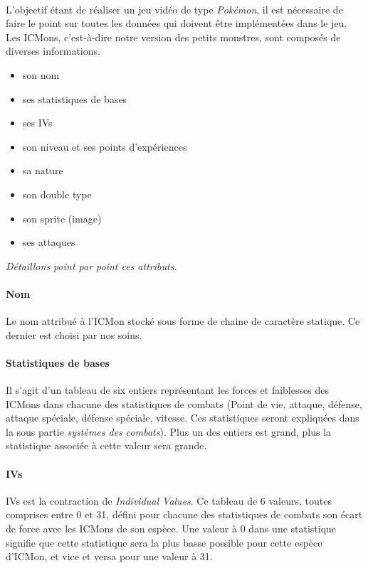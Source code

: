 \documentclass[12pt,a4paper, twoside]{article}
\begin{document}
        \paragraph{} L'objectif étant de réaliser un jeu vidéo de type \emph{Pokémon}, il est nécessaire de faire le point sur toutes les données qui doivent être implémentées dans le jeu.\\
        Les ICMons, c'est-à-dire notre version des petits monstres, sont composés de diverses informations. \\
        \begin{itemize}
            \item son nom
            \item ses statistiques de bases
            \item ses IVs
            \item son niveau et ses points d'expériences
            \item sa nature
            \item son double type
            \item son sprite (image)
            \item ses attaques
        \end{itemize}
        \emph{Détaillons point par point ces attributs.}
        \paragraph{Nom} Le nom attribué à l'ICMon stocké sous forme de chaine de caractère statique. Ce dernier est choisi par nos soins.
        \paragraph{Statistiques de bases} Il s'agit d'un tableau de six entiers représentant les forces et faiblesses des ICMons dans chacune des statistiques de combats (Point de vie, attaque, défense, attaque spéciale, défense spéciale, vitesse. Ces statistiques seront expliquées dans la sous partie \emph{systèmes des combats}).
        Plus un des entiers est grand, plus la statistique associée à cette valeur sera grande.
        \paragraph{IVs} IVs est la contraction de \emph{Individual Values}. Ce tableau de 6 valeurs, toutes comprises entre 0 et 31, défini pour chacune des statistiques de combats son écart de force avec les ICMons de son espèce. Une valeur à 0 dans une statistique signifie que cette statistique sera la plus basse possible pour cette espèce d'ICMon, et vice et versa pour une valeur à 31.
\end{document}
